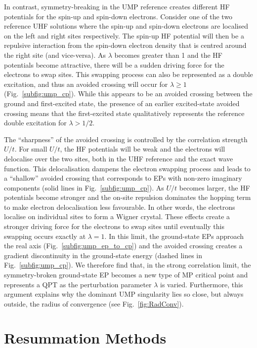 \documentclass[aps,prb,reprint,noshowkeys,superscriptaddress]{revtex4-1}
\begin{document}
In contrast, symmetry-breaking in the UMP reference creates different HF potentials for the spin-up and spin-down electrons.
Consider one of the two reference UHF solutions where the spin-up and spin-down electrons are localised on the left and right sites respectively. 
The spin-up HF potential will then be a repulsive interaction from the spin-down electron 
density that is centred around the right site (and vice-versa).
As $\lambda$ becomes greater than 1 and the HF potentials become attractive, there will be a sudden
driving force for the electrons to swap sites.
This swapping process can also be represented as a double excitation, and thus an avoided crossing will occur
for $\lambda \geq 1$ (Fig.~\ref{subfig:ump_cp}).
While this appears to be an avoided crossing between the ground and first-excited state, 
the presence of an earlier excited-state avoided crossing means that the first-excited state qualitatively 
represents the reference double excitation for $\lambda > 1/2$.

The ``sharpness'' of the avoided crossing is controlled by the correlation strength $U/t$.
For small $U/t$, the HF potentials will be weak and the electrons will delocalise over the two sites,
both in the UHF reference and the exact wave function.
This delocalisation dampens the electron swapping process and leads to a ``shallow'' avoided crossing
that corresponds to EPs with non-zero imaginary components (solid lines in Fig.~\ref{subfig:ump_cp}).
As $U/t$ becomes larger, the HF potentials become stronger and the on-site repulsion dominates the hopping
term to make electron delocalisation less favourable.
In other words, the electrons localise on individual sites to form a Wigner crystal.
These effects create a stronger driving force for the electrons to swap sites until eventually this swapping
occurs exactly at $\lambda = 1$.
In this limit, the ground-state EPs approach the real axis (Fig.~\ref{subfig:ump_ep_to_cp}) and the avoided 
crossing creates a gradient discontinuity in the ground-state energy (dashed lines in Fig.~\ref{subfig:ump_cp}).
We therefore find that, in the strong correlation limit, the symmetry-broken ground-state EP becomes
a new type of MP critical point and represents a QPT as the perturbation parameter $\lambda$ is varied.
Furthermore, this argument explains why the dominant UMP singularity lies so close, but always outside, the 
radius of convergence (see Fig.~\ref{fig:RadConv}).

\section{Resummation Methods}
\label{sec:Resummation}
\end{document}
